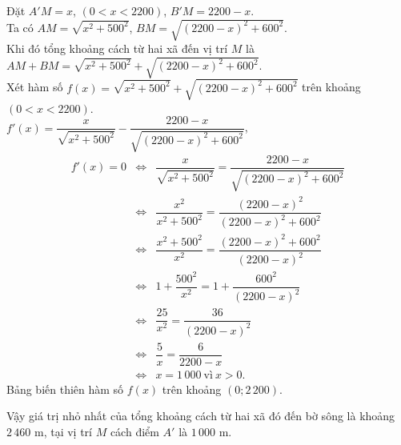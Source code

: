 \begin{ex}
{\begin{center}
		\end{center}
		Đặt $A'M=x$, $(0<x<2200)$,  $B'M=2200-x$.\\
		Ta có  $AM=\sqrt{x^2+500^2}$, $BM=\sqrt{(2200-x)^2+600^2}$.\\
		Khi đó tổng khoảng cách từ hai xã đến vị trí $M$ là $AM+BM= \sqrt{x^2+500^2}+\sqrt{(2200-x)^2+600^2} $.\\
		Xét hàm số $f(x)= \sqrt{x^2+500^2}+\sqrt{(2200-x)^2+600^2}$ trên khoảng $(0<x<2200)$.\\
		$f'(x)=\dfrac{x}{\sqrt{x^2+500^2}}-\dfrac{2200-x}{\sqrt{(2200-x)^2+600^2}}$,
		\allowdisplaybreaks
		\begin{eqnarray*}
			f'(x)=0&\Leftrightarrow&\dfrac{x}{\sqrt{x^2+500^2}}=\dfrac{2200-x}{\sqrt{(2200-x)^2+600^2}}
			\\
			&\Leftrightarrow&\dfrac{x^2}{x^2+500^2}=\dfrac{(2200-x)^2}{(2200-x)^2+600^2}\\
			&\Leftrightarrow&\dfrac{x^2+500^2}{x^2}=\dfrac{(2200-x)^2+600^2}{(2200-x)^2}\\
			&\Leftrightarrow& 1+\dfrac{500^2}{x^2}=1+\dfrac{600^2}{(2200-x)^2}
			\\
			&\Leftrightarrow& \dfrac{25}{x^2}=\dfrac{36}{(2200-x)^2}
			\\
			&\Leftrightarrow& \dfrac{5}{x}=\dfrac{6}{2200-x}
			\\
			&\Leftrightarrow& x=1\,000~ \text{vì}~  x>0.
		\end{eqnarray*}
		Bảng biến thiên hàm số $f(x)$ trên khoảng $( 0;2\,200)$.
		\begin{center}
		\end{center}
		Vậy giá trị nhỏ nhất của tổng khoảng cách từ hai xã đó đến bờ sông  là khoảng $2\,460$  m, tại vị trí $M$ cách điểm $A'$  là $1\,000$  m.
	}
\end{ex}


